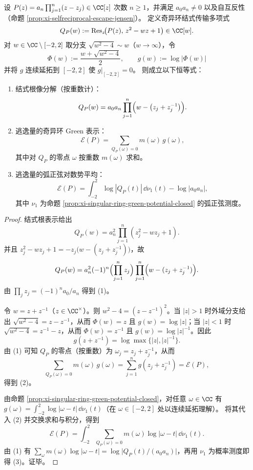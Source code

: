 \begin{theorem}[自互反逃逸量的奇异环结式势表示]\label{thm:xi-selfreciprocal-escape-singular-ring-resultant}
设 \(P(z)=a_n\prod_{j=1}^{n}(z-z_j)\in\CC[z]\) 次数 \(n\ge 1\)，并满足 \(a_0a_n\neq 0\) 以及自互反性（命题 \ref{prop:xi-selfreciprocal-escape-jensen}）。
定义奇异环结式传输多项式
\[
Q_P(w):=\operatorname{Res}_{z}\!\bigl(P(z),\,z^2-wz+1\bigr)\in\CC[w].
\]
对 \(w\in\CC\setminus[-2,2]\) 取分支 \(\sqrt{w^2-4}\sim w\)（\(w\to\infty\)），令
\[
\Phi(w):=\frac{w+\sqrt{w^2-4}}{2},
\qquad
g(w):=\log|\Phi(w)|
\]
并将 \(g\) 连续延拓到 \([-2,2]\) 使 \(g|_{[-2,2]}=0\)。
则成立以下恒等式：
\begin{enumerate}
  \item 结式根像分解（按重数计）：
  \[
  Q_P(w)=a_0a_n\prod_{j=1}^{n}\Bigl(w-\bigl(z_j+z_j^{-1}\bigr)\Bigr).
  \]
  \item 逃逸量的奇异环 Green 表示：
  \[
  \mathcal{E}(P)=\sum_{Q_P(\omega)=0} m(\omega)\,g(\omega),
  \]
  其中对 \(Q_P\) 的零点 \(\omega\) 按重数 \(m(\omega)\) 求和。
  \item 逃逸量的弧正弦对数势平均：
  \[
  \mathcal{E}(P)=\int_{-2}^{2}\log|Q_P(t)|\,\dd\nu_1(t)-\log|a_0a_n|,
  \]
  其中 \(\nu_1\) 为命题 \ref{prop:xi-singular-ring-green-potential-closed} 的弧正弦测度。
\end{enumerate}
\end{theorem}
\begin{proof}
结式根表示给出
\[
Q_P(w)=a_n^2\prod_{j=1}^{n}(z_j^2-wz_j+1).
\]
并且
\(
z_j^2-wz_j+1=-z_j\bigl(w-(z_j+z_j^{-1})\bigr)
\)，故
\[
Q_P(w)=a_n^2(-1)^n\Bigl(\prod_{j=1}^{n}z_j\Bigr)\prod_{j=1}^{n}\Bigl(w-(z_j+z_j^{-1})\Bigr).
\]
由 \(\prod_j z_j=(-1)^n a_0/a_n\) 得到 (1)。
\par
令 \(w=z+z^{-1}\)（\(z\in\CC^\times\)）。则 \(w^2-4=(z-z^{-1})^2\)。当 \(|z|>1\) 时外域分支给出 \(\sqrt{w^2-4}=z-z^{-1}\)，从而 \(\Phi(w)=z\) 且 \(g(w)=\log|z|\)；当 \(|z|<1\) 时 \(\sqrt{w^2-4}=z^{-1}-z\)，从而 \(\Phi(w)=z^{-1}\) 且 \(g(w)=\log|z|^{-1}\)。因此
\[
g(z+z^{-1})=\log\max\{|z|,|z|^{-1}\}.
\]
由 (1) 可知 \(Q_P\) 的零点（按重数）为 \(\omega_j=z_j+z_j^{-1}\)，从而
\[
\sum_{Q_P(\omega)=0}m(\omega)\,g(\omega)=\sum_{j=1}^{n}g(z_j+z_j^{-1})=\mathcal{E}(P),
\]
得到 (2)。
\par
由命题 \ref{prop:xi-singular-ring-green-potential-closed}，对任意 \(\omega\in\CC\) 有
\(
g(\omega)=\int_{-2}^{2}\log|\omega-t|\,\dd\nu_1(t)
\)（在 \(\omega\in[-2,2]\) 处以连续延拓理解）。
将其代入 (2) 并交换求和与积分，得到
\[
\mathcal{E}(P)=\int_{-2}^{2}\sum_{Q_P(\omega)=0}m(\omega)\log|\omega-t|\,\dd\nu_1(t).
\]
由 (1) 有
\(
\sum_{\omega}m(\omega)\log|\omega-t|=\log\bigl|Q_P(t)/(a_0a_n)\bigr|
\)，再用 \(\nu_1\) 为概率测度即得 (3)。证毕。
\end{proof}

